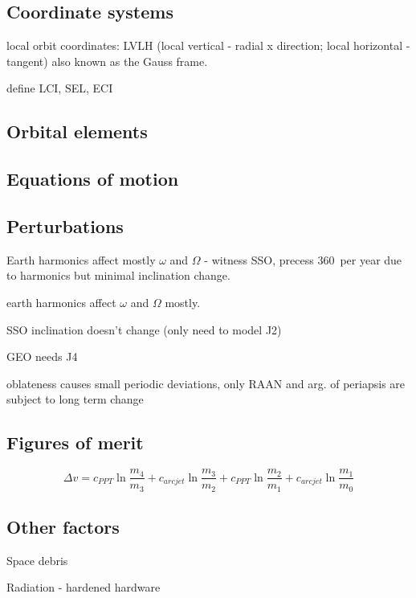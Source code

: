 \subsection{Coordinate systems}
local orbit coordinates: LVLH (local vertical - radial x direction; local horizontal - tangent) also known as the Gauss frame. \cite{STK}

define LCI, SEL, ECI

\subsection{Orbital elements}
\subsection{Equations of motion}
\subsection{Perturbations}
Earth harmonics affect mostly $\omega$ and $\Omega$ - witness SSO, precess 360\degrees\ per year due to harmonics but minimal inclination change.

earth harmonics affect $\omega$ and $\Omega$ mostly. \textcite{Eshagh2007} 

SSO inclination doesn't change (only need to model J2)

GEO needs J4

oblateness causes small periodic deviations, only RAAN and arg. of periapsis are subject to long term change \textcite{Montenbruck2000}

\subsection{Figures of merit}
\begin{equation}
\Delta v= c_{PPT}\ln\frac{m_4}{m_3}+c_{arcjet}\ln\frac{m_3}{m_2}+c_{PPT}\ln\frac{m_2}{m_1}+c_{arcjet}\ln\frac{m_1}{m_0}
\end{equation}

\subsection{Other factors}
Space debris

Radiation - hardened hardware

